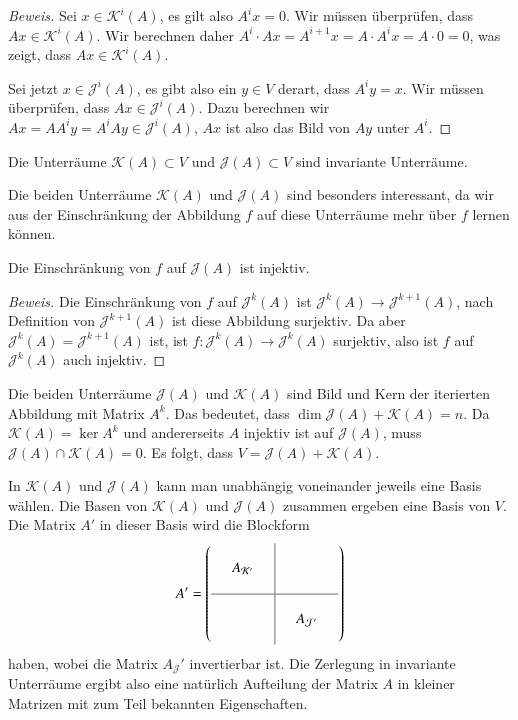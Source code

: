 \begin{proof}[Beweis]
Sei $x\in\mathcal{K}^i(A)$, es gilt also $A^ix=0$.
Wir müssen überprüfen, dass $Ax\in\mathcal{K}^i(A)$.
Wir berechnen daher $A^i\cdot Ax=A^{i+1}x=A\cdot A^ix = A\cdot 0=0$,
was zeigt, dass $Ax\in\mathcal{K}^i(A)$.

Sei jetzt $x\in\mathcal{J}^i(A)$, es gibt also ein $y\in V$ derart, dass
$A^iy=x$.
Wir müssen überprüfen, dass $Ax\in\mathcal{J}^i(A)$.
Dazu berechnen wir $Ax=AA^iy=A^iAy\in\mathcal{J}^i(A)$, $Ax$ ist also das
Bild von $Ay$ unter $A^i$.
\end{proof}

\begin{korollar}
Die Unterräume $\mathcal{K}(A)\subset V$ und $\mathcal{J}(A)\subset V$
sind invariante Unterräume.
\end{korollar}

Die beiden Unterräume $\mathcal{K}(A)$ und $\mathcal{J}(A)$ sind besonders
interessant, da wir aus der Einschränkung der Abbildung $f$ auf diese
Unterräume mehr über $f$ lernen können.

\begin{satz}
\label{buch:eigenwerte:satz:fJinj}
Die Einschränkung von $f$ auf $\mathcal{J}(A)$ ist injektiv.
\end{satz}

\begin{proof}[Beweis]
Die Einschränkung von $f$ auf $\mathcal{J}^k(A)$ ist
$\mathcal{J}^k(A) \to \mathcal{J}^{k+1}(A)$, nach Definition von
$\mathcal{J}^{k+1}(A)$ ist diese Abbildung surjektiv.
Da aber $\mathcal{J}^k(A)=\mathcal{J}^{k+1}(A)$ ist, ist
$f\colon \mathcal{J}^k(A)\to\mathcal{J}^k(A)$ surjektiv,
also ist $f$ auf $\mathcal{J}^k(A)$ auch injektiv.
\end{proof}

Die beiden Unterräume $\mathcal{J}(A)$ und $\mathcal{K}(A)$
sind Bild und Kern der iterierten Abbildung mit Matrix $A^k$.
Das bedeutet, dass $\dim\mathcal{J}(A)+\mathcal{K}(A)=n$.
Da $\mathcal{K}(A)=\ker A^k$ und andererseits $A$ injektiv ist auf
$\mathcal{J}(A)$, muss $\mathcal{J}(A)\cap\mathcal{K}(A)=0$.
Es folgt, dass $V=\mathcal{J}(A) + \mathcal{K}(A)$.

In $\mathcal{K}(A)$ und $\mathcal{J}(A)$ kann man unabhängig voneinander
jeweils eine Basis wählen.
Die Basen von $\mathcal{K}(A)$ und $\mathcal{J}(A)$ zusammen ergeben
eine Basis von $V$.
Die Matrix $A'$ in dieser Basis wird die Blockform
\[
A'
=
\left(
\begin{array}{ccc|ccc}
&&&&&\\
&A_{\mathcal{K}'}&&&&\\
&&&&&\\
\hline
&&&&&\\
&&&&A_{\mathcal{J}'}&\\
&&&&&\\
\end{array}
\right)
\]
haben, wobei die Matrix $A_\mathcal{J}'$ invertierbar ist.
Die Zerlegung in invariante Unterräume ergibt also eine natürlich
Aufteilung der Matrix $A$ in kleiner Matrizen mit zum Teil bekannten
Eigenschaften.

